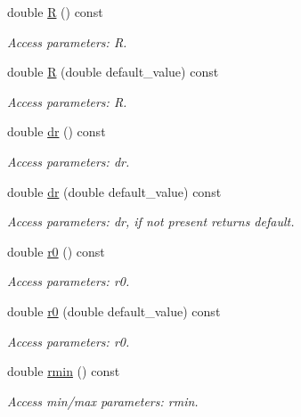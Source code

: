 \begin{DoxyCompactItemize}
double \hyperlink{struct_d_d4hep_1_1_x_m_l_1_1_dimension_afab3533801f3146dfe0ea6285375a980}{R} () const
\begin{DoxyCompactList}\small\item\em Access parameters\+: R. \end{DoxyCompactList}\item 
double \hyperlink{struct_d_d4hep_1_1_x_m_l_1_1_dimension_aa247fd71861b8a3cde7f313abd8f2f5d}{R} (double default\+\_\+value) const
\begin{DoxyCompactList}\small\item\em Access parameters\+: R. \end{DoxyCompactList}\item 
double \hyperlink{struct_d_d4hep_1_1_x_m_l_1_1_dimension_ab7b4ce1baea4500c995b0cd954081067}{dr} () const
\begin{DoxyCompactList}\small\item\em Access parameters\+: dr. \end{DoxyCompactList}\item 
double \hyperlink{struct_d_d4hep_1_1_x_m_l_1_1_dimension_af1d458915c4ccbb4862a4abc8368207a}{dr} (double default\+\_\+value) const
\begin{DoxyCompactList}\small\item\em Access parameters\+: dr, if not present returns default. \end{DoxyCompactList}\item 
double \hyperlink{struct_d_d4hep_1_1_x_m_l_1_1_dimension_ae202dea16ed0bc4bb3c87a53c844ef88}{r0} () const
\begin{DoxyCompactList}\small\item\em Access parameters\+: r0. \end{DoxyCompactList}\item 
double \hyperlink{struct_d_d4hep_1_1_x_m_l_1_1_dimension_a44b89631c5a046ad28444a9ee577c765}{r0} (double default\+\_\+value) const
\begin{DoxyCompactList}\small\item\em Access parameters\+: r0. \end{DoxyCompactList}\item 
double \hyperlink{struct_d_d4hep_1_1_x_m_l_1_1_dimension_a2da6a78b6ac95555cc835a19729f455a}{rmin} () const
\begin{DoxyCompactList}\small\item\em Access min/max parameters\+: rmin. \end{DoxyCompactList}\item 

\end{DoxyCompactItemize}

